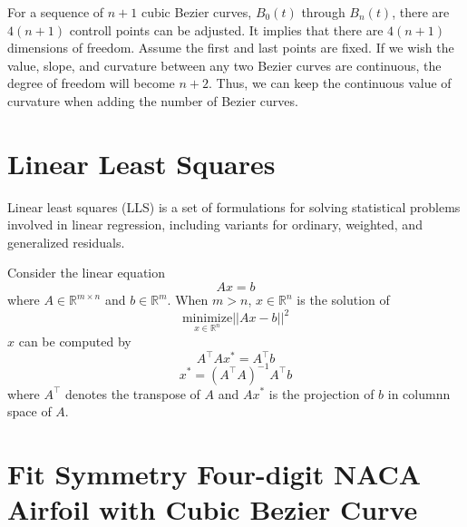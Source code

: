 \documentclass{turgon}
\begin{document}
For a sequence of $n+1$ cubic Bezier curves, $B_0(t)$ through $B_n(t)$,
there are $4(n+1)$ controll points can be adjusted. It implies that there
are $4(n+1)$ dimensions of freedom. Assume the first and last points are
fixed. If we wish the value, slope, and curvature between any two Bezier
curves are continuous, the degree of freedom will become $n+2$. Thus, we
can keep the continuous value of curvature when adding the number of Bezier
curves.

\chapter{Linear Least Squares}


Linear least squares (LLS) is a set of formulations for solving statistical
problems involved in linear regression, including variants for ordinary,
weighted, and generalized residuals.

Consider the linear equation
\begin{equation}
    Ax = b
    \label{e:lls:leq}
\end{equation}
where $A \in \mathbb{R}^{m \times n}$ and $b \in \mathbb{R}^m$. When $m>n$,
$x \in \mathbb{R}^n$ is the solution of
\begin{equation*}
    \underset{x \in \mathbb{R}^n}{\text{minimize}} ||A x - b||^2
\end{equation*}
$x$ can be computed by
\begin{equation*}
    A^\top A x^* = A^\top b
\end{equation*}
\begin{equation*}
    x^* = (A^\top A)^{-1} A^\top b
    \label{e:lls:sol}
\end{equation*}
where $A^\top$ denotes the transpose of $A$ and $Ax^*$ is the projection of
$b$ in columnn space of $A$.

\chapter{Fit Symmetry Four-digit NACA Airfoil with Cubic Bezier Curve}

\end{document}

